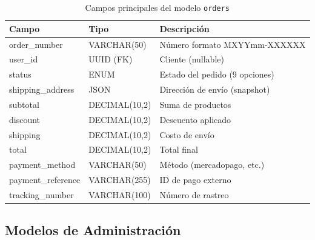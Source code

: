 \documentclass[12pt, a4paper]{article}
\begin{document}
\begin{table}[H]
\centering
\small
\begin{tabularx}{\textwidth}{llX}
\toprule
\textbf{Campo} & \textbf{Tipo} & \textbf{Descripci\'{o}n} \\
\midrule
order\_number & VARCHAR(50) & N\'{u}mero formato MXYYmm-XXXXXX \\
user\_id & UUID (FK) & Cliente (nullable) \\
status & ENUM & Estado del pedido (9 opciones) \\
shipping\_address & JSON & Direcci\'{o}n de env\'{i}o (snapshot) \\
subtotal & DECIMAL(10,2) & Suma de productos \\
discount & DECIMAL(10,2) & Descuento aplicado \\
shipping & DECIMAL(10,2) & Costo de env\'{i}o \\
total & DECIMAL(10,2) & Total final \\
payment\_method & VARCHAR(50) & M\'{e}todo (mercadopago, etc.) \\
payment\_reference & VARCHAR(255) & ID de pago externo \\
tracking\_number & VARCHAR(100) & N\'{u}mero de rastreo \\
\bottomrule
\end{tabularx}
\caption{Campos principales del modelo \texttt{orders}}
\end{table}

\subsection{Modelos de Administraci\'{o}n}
\end{document}
